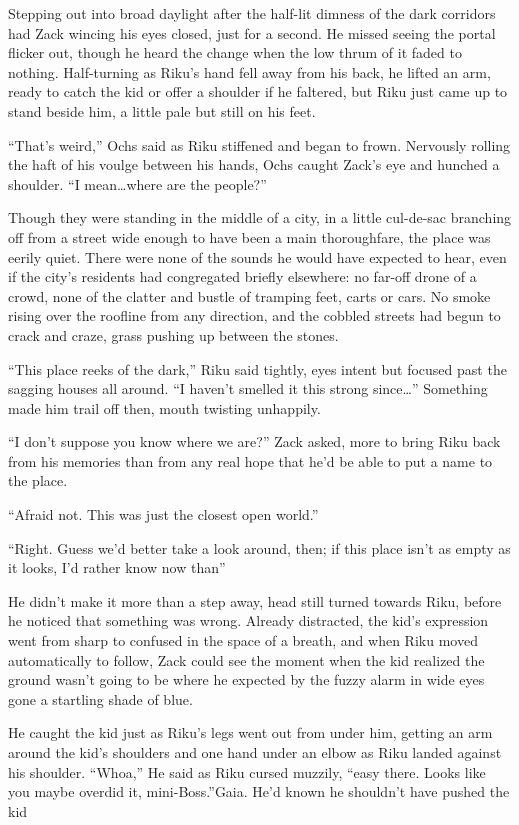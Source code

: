 \scenechange

Stepping out into broad daylight after the half-lit dimness of the dark corridors had Zack wincing his eyes closed, just for a second. He missed seeing the portal flicker out, though he heard the change when the low thrum of it faded to nothing. Half-turning as Riku's hand fell away from his back, he lifted an arm, ready to catch the kid or offer a shoulder if he faltered, but Riku just came up to stand beside him, a little pale but still on his feet.

``That's weird,'' Ochs said as Riku stiffened and began to frown. Nervously rolling the haft of his voulge between his hands, Ochs caught Zack's eye and hunched a shoulder. ``I mean\ldots where are the people?''

Though they were standing in the middle of a city, in a little cul-de-sac branching off from a street wide enough to have been a main thoroughfare, the place was eerily quiet. There were none of the sounds he would have expected to hear, even if the city's residents had congregated briefly elsewhere: no far-off drone of a crowd, none of the clatter and bustle of tramping feet, carts or cars. No smoke rising over the roofline from any direction, and the cobbled streets had begun to crack and craze, grass pushing up between the stones.

``This place reeks of the dark,'' Riku said tightly, eyes intent but focused past the sagging houses all around. ``I haven't smelled it this strong since\ldots'' Something made him trail off then, mouth twisting unhappily.

``I don't suppose you know where we are?'' Zack asked, more to bring Riku back from his memories than from any real hope that he'd be able to put a name to the place.

``Afraid not. This was just the closest open world.''

``Right. Guess we'd better take a look around, then; if this place isn't as empty as it looks, I'd rather know now than\textemdash ''

He didn't make it more than a step away, head still turned towards Riku, before he noticed that something was wrong. Already distracted, the kid's expression went from sharp to confused in the space of a breath, and when Riku moved automatically to follow, Zack could see the moment when the kid realized the ground wasn't going to be where he expected by the fuzzy alarm in wide eyes gone a startling shade of blue.

He caught the kid just as Riku's legs went out from under him, getting an arm around the kid's shoulders and one hand under an elbow as Riku landed against his shoulder. ``Whoa,'' He said as Riku cursed muzzily, ``easy there. Looks like you maybe overdid it, mini-Boss.''Gaia. He'd known he shouldn't have pushed the kid\textemdash 

